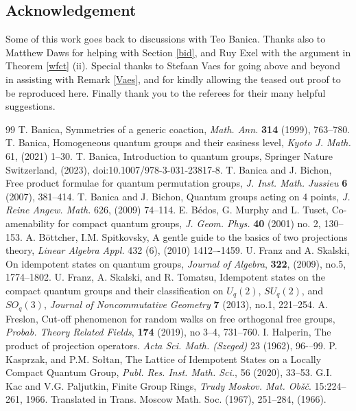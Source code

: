 \documentclass[12pt]{amsart}
\theoremstyle{remark}
\theoremstyle{remark}
\begin{document}
\subsection*{Acknowledgement}
Some of this work goes back to discussions with Teo Banica. Thanks also to Matthew Daws for helping with Section \ref{bid}, and Ruy Exel with the argument in Theorem \ref{wfct} (ii). Special thanks to Stefaan Vaes for going above and beyond in assisting with Remark \ref{Vaes}, and for kindly allowing the teased out proof to be reproduced here. Finally thank you to the referees for their many helpful suggestions.
\begin{thebibliography}{99}
T. Banica, Symmetries of a generic coaction, \emph{Math. Ann.} \textbf{314} (1999), 763--780.
T. Banica, Homogeneous quantum groups and their easiness level, \emph{Kyoto J. Math.} 61, (2021) 1--30.
T. Banica, Introduction to quantum groups, Springer Nature Switzerland, (2023), doi:10.1007/978-3-031-23817-8.
T. Banica and J. Bichon, Free product formulae for quantum permutation groups, {\em J. Inst. Math. Jussieu} {\bf 6} (2007), 381--414.
T. Banica and J. Bichon, Quantum groups acting on 4 points, \emph{J. Reine Angew. Math.} 626, (2009) 74--114.
E. B\'{e}dos, G. Murphy and L. Tuset, Co-amenability for compact quantum groups, \emph{J. Geom. Phys.} \textbf{40}
(2001) no. 2, 130--153.
 A. B\"{o}ttcher, I.M. Spitkovsky, A gentle guide to the basics of two projections theory, \emph{Linear Algebra Appl.} 432 (6), (2010) 1412–-1459.
U. Franz and A. Skalski, On idempotent states on quantum groups, \emph{Journal of Algebra}, \textbf{322}, (2009), no.5, 1774--1802.
U. Franz, A. Skalski, and R. Tomatsu, Idempotent states on the compact quantum groups and their classification on $U_q(2)$, $SU_q(2)$, and $SO_q(3)$, \emph{Journal of Noncommutative Geometry} \textbf{7} (2013), no.1, 221--254.
A. Freslon, Cut-off phenomenon for random walks on free orthogonal free groups, \emph{Probab. Theory Related Fields}, \textbf{174} (2019), no 3--4, 731--760.
I. Halperin, The product of projection operators. \emph{Acta Sci. Math. (Szeged)} 23 (1962), 96-–99.
P. Kasprzak, and P.M.  So{\l}tan, The Lattice of Idempotent States on a Locally Compact Quantum Group, \emph{Publ. Res. Inst. Math. Sci.}, 56 (2020), 33--53.
G.I. Kac and V.G. Paljutkin, Finite Group Rings, \emph{Trudy Moskov. Mat. Ob\v{s}\v{c}}.  15:224--261, 1966. Translated in Trans. Moscow Math. Soc. (1967), 251--284, (1966).

\end{thebibliography}
\end{document}
